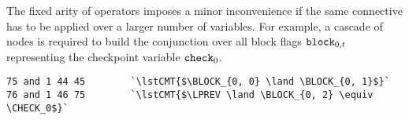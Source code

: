 \noindent
The fixed arity of {\BTOR} operators imposes a minor inconvenience
if the same connective has to be applied over a larger number of variables.
For example, a cascade of  nodes is required to build the conjunction over all block flags $\texttt{block}_{0, t}$ representing the checkpoint variable $\texttt{check}_0$.
\begin{lstlisting}[style=btor2]
75 and 1 44 45        `\lstCMT{$\BLOCK_{0, 0} \land \BLOCK_{0, 1}$}`
76 and 1 46 75        `\lstCMT{$\LPREV \land \BLOCK_{0, 2} \equiv \CHECK_0$}`
\end{lstlisting}

